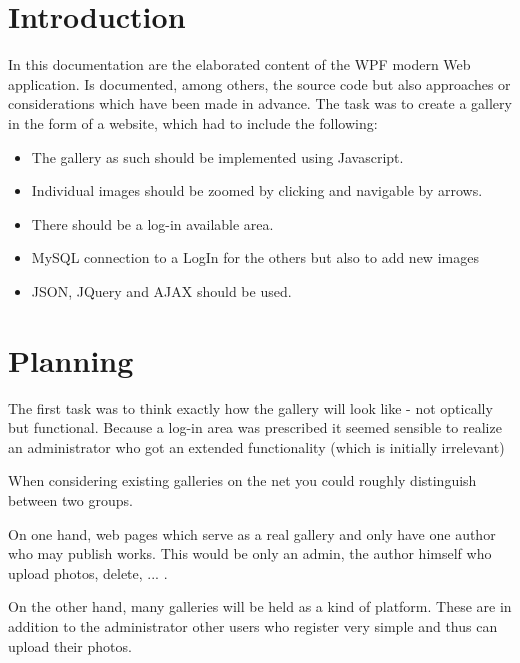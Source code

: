 \documentclass[a4paper,12pt,oneside]{article} %
\begin{document}
  
  \tableofcontents
	\pagestyle{fancy}
   		
 \newpage %
  
 \listoffigures

  

\newpage

\section{Introduction}

In this documentation are the elaborated content of the WPF modern
Web application. Is documented, among others, the source code but
also approaches or considerations which have been made in advance.
The task was to create a gallery in the form of a website, which had
to include the following:
\begin{itemize}
\item The gallery as such should be implemented using Javascript. 
\item Individual images should be zoomed by clicking and navigable by arrows. 
\item There should be a log-in available area. 
\item MySQL connection to a LogIn for the others but also to add new images 
\item JSON, JQuery and AJAX should be used.
\end{itemize}

\section{Planning}

The first task was to think exactly how the gallery will look like
- not optically but functional. Because a log-in area was prescribed
it seemed sensible to realize an administrator who got an extended
functionality (which is initially irrelevant) 

When considering existing galleries on the net you could roughly distinguish
between two groups. 

On one hand, web pages which serve as a real gallery and only have
one author who may publish works. This would be only an admin, the
author himself who upload photos, delete, ... .

On the other hand, many galleries will be held as a kind of platform.
These are in addition to the administrator other users who register
very simple and thus can upload their photos.
\end{document}
